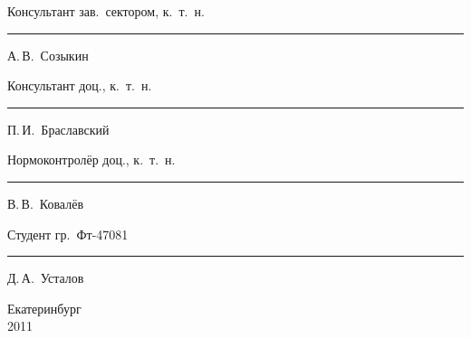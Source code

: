 \begin{centering}
\vspace{1.2em}

\begin{minipage}{0.45\textwidth}
  \begin{flushleft}
    Консультант зав.\ сектором, к.\ т.\ н.
  \end{flushleft}
\end{minipage}
\begin{minipage}{0.5\textwidth}
  \begin{flushleft}
    \rule{3cm}{1pt} А.\,В.~Созыкин
  \end{flushleft}
\end{minipage}

\vspace{1.2em}

\begin{minipage}{0.45\textwidth}
  \begin{flushleft}
    Консультант доц., к.\ т.\ н.
  \end{flushleft}
\end{minipage}
\begin{minipage}{0.5\textwidth}
  \begin{flushleft}
    \rule{3cm}{1pt} П.\,И.~Браславский
  \end{flushleft}
\end{minipage}

\vspace{1.2em}

\begin{minipage}{0.45\textwidth}
  \begin{flushleft}
    Нормоконтролёр доц., к.\ т.\ н.
  \end{flushleft}
\end{minipage}
\begin{minipage}{0.5\textwidth}
  \begin{flushleft}
    \rule{3cm}{1pt} В.\,В.~Ковалёв
  \end{flushleft}
\end{minipage}

\vspace{1.2em}

\begin{minipage}{0.45\textwidth}
  \begin{flushleft}
    Студент гр.~Фт-47081
  \end{flushleft}
\end{minipage}
\begin{minipage}{0.5\textwidth}
  \begin{flushleft}
    \rule{3cm}{1pt} Д.\,А.~Усталов
  \end{flushleft}
\end{minipage}

\vfill

Екатеринбург \\
2011

\end{centering}
